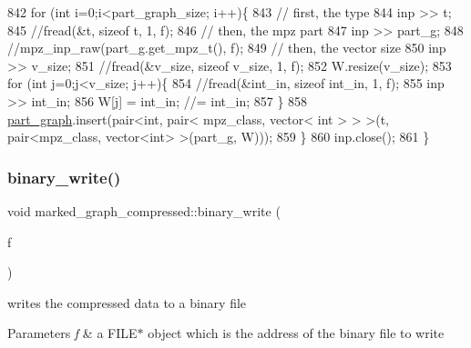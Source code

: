 \begin{DoxyCode}
842   \textcolor{keywordflow}{for} (\textcolor{keywordtype}{int} i=0;i<part\_graph\_size; i++)\{
843     \textcolor{comment}{// first, the type}
844     inp >> t; 
845     \textcolor{comment}{//fread(&t, sizeof t, 1, f);}
846     \textcolor{comment}{// then, the mpz part}
847     inp >> part\_g;
848     \textcolor{comment}{//mpz\_inp\_raw(part\_g.get\_mpz\_t(), f);}
849     \textcolor{comment}{// then, the vector size}
850     inp >> v\_size;
851     \textcolor{comment}{//fread(&v\_size, sizeof v\_size, 1, f);}
852     W.resize(v\_size);
853     \textcolor{keywordflow}{for} (\textcolor{keywordtype}{int} j=0;j<v\_size; j++)\{
854       \textcolor{comment}{//fread(&int\_in, sizeof int\_in, 1, f);}
855       inp >> int\_in;
856       W[j] = int\_in; \textcolor{comment}{//= int\_in;}
857     \}
858     \hyperlink{classmarked__graph__compressed_ae179a4737e6eab905c18a94d44ef64b7}{part\_graph}.insert(pair<\textcolor{keywordtype}{int}, pair< mpz\_class, vector< int > > >(t, pair<mpz\_class, vector<int>
       >(part\_g, W)));
859   \}
860   inp.close();
861 \}
\end{DoxyCode}
\mbox{\label{classmarked__graph__compressed_ab9cdb7fc43badd58fb5202f74ffac723}} 
\subsubsection{\texorpdfstring{binary\+\_\+write()}{binary\_write()}\hspace{0.1cm}{\footnotesize\ttfamily [1/2]}}
{\footnotesize\ttfamily void marked\+\_\+graph\+\_\+compressed\+::binary\+\_\+write (\begin{DoxyParamCaption}\item[{F\+I\+LE $\ast$}]{f }\end{DoxyParamCaption})}



writes the compressed data to a binary file 


\begin{DoxyParams}{Parameters}
{\em f} & a {\ttfamily F\+I\+L\+E$\ast$} object which is the address of the binary file to write \\
\hline
\end{DoxyParams}

